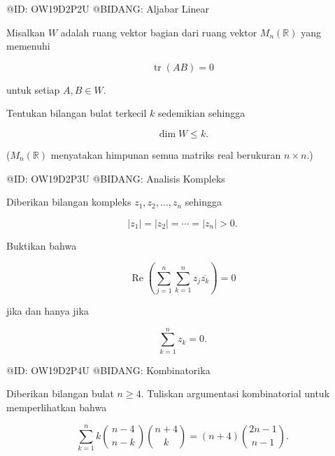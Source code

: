@ID: OW19D2P2U
@BIDANG: Aljabar Linear

Misalkan $W$ adalah ruang vektor bagian dari ruang vektor $M_n(\mathbb R)$ yang memenuhi

$$
\operatorname{tr}(AB)=0
$$

untuk setiap $A,B\in W$.

Tentukan bilangan bulat terkecil $k$ sedemikian sehingga

$$
\dim W\le k.
$$

($M_n(\mathbb R)$ menyatakan himpunan semua matriks real berukuran $n\times n$.)

@ID: OW19D2P3U
@BIDANG: Analisis Kompleks

Diberikan bilangan kompleks $z_1,z_2,\ldots,z_n$ sehingga

$$
|z_1|=|z_2|=\cdots=|z_n|>0.
$$

Buktikan bahwa

$$
\operatorname{Re}\left(\sum_{j=1}^n\sum_{k=1}^n z_j\overline{z_k}\right)=0
$$

jika dan hanya jika

$$
\sum_{k=1}^n z_k=0.
$$

@ID: OW19D2P4U
@BIDANG: Kombinatorika

Diberikan bilangan bulat $n\ge4$. Tuliskan argumentasi kombinatorial untuk memperlihatkan bahwa

$$
\sum_{k=1}^n
k
\binom{n-4}{\,n-k\,}
\binom{n+4}{k}
=
(n+4)\binom{2n-1}{n-1}.
$$